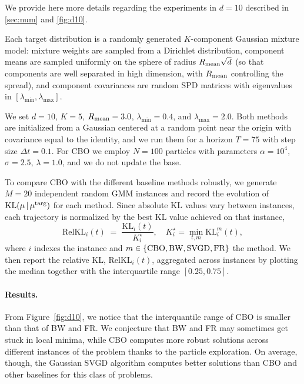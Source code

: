 \documentclass{article}
\theoremstyle{plain}
\theoremstyle{definition}
\theoremstyle{remark}
\newcommand{\targ}{\textup{targ}}
\newcommand{\rev}{}
\begin{document}
We provide here more details regarding the experiments in $d = 10$ 
described in \cref{sec:num} and \cref{fig:d10}.

Each target distribution is a randomly generated $K$-component Gaussian mixture model: mixture weights are sampled from a Dirichlet distribution, component means are sampled uniformly on the sphere of radius $R_{\textup{mean}}\sqrt{d}$ (so that components are well separated in high dimension, with $R_{\textup{mean}}$ controlling the spread), and component covariances are random SPD matrices with eigenvalues in $[\lambda_{\min},\lambda_{\max}]$. 

We set $d=10$, $K=5$, $R_{\textup{mean}}=3.0$, $\lambda_{\min}=0.4$, and $\lambda_{\max}=2.0$. 
Both methods are initialized from a Gaussian centered at a random point near the origin with covariance equal to the identity, and we run them for a horizon $T=75$ with step size $\Delta t = 0.1$. 
For CBO we employ $N=100$ particles with parameters $\alpha=10^4$, $\sigma=2.5$, $\lambda=1.0$, and we do not update the base. 

To compare \rev{CBO with the different baseline} methods robustly, we generate $M=20$ independent random GMM instances and record the evolution of $\mathrm{KL}(\mu\,|\,\mu^\targ)$ for each method. 
Since absolute KL values vary between instances, each trajectory is normalized by the best KL value achieved on that instance, 
\[
\mathrm{RelKL}_i(t) \;=\; \frac{\mathrm{KL}_i(t)}{K_i^\star}, \quad 
K_i^\star = \min_{t,m} \mathrm{KL}_i^m(t),
\]
where $i$ indexes the instance and $m \in \rev{\{\textup{CBO}, \textup{BW},\textup{SVGD},\textup{FR}\}}$ the method. 
We then report the relative KL, $\mathrm{RelKL}_i(t)$, aggregated across instances by plotting the median together with the interquartile range $[0.25, 0.75]$. 

\paragraph{Results.} 
From Figure~\ref{fig:d10}, we notice that the interquantile range of CBO is smaller than that of \rev{BW and FR}. We conjecture that \rev{BW and FR} may sometimes get stuck in local minima, while CBO computes more robust solutions across different instances of the problem thanks to the particle exploration. On average, \rev{though, the Gaussian SVGD} algorithm computes better solutions than \rev{CBO and other baselines} for this class of problems.
\end{document}
